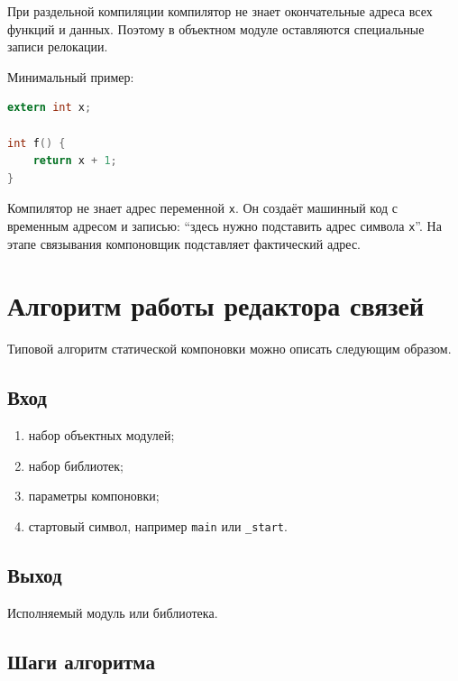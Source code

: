 \documentclass[12pt,a4paper]{article}
\begin{document}
При раздельной компиляции компилятор не знает окончательные адреса всех функций и данных. Поэтому в объектном модуле оставляются специальные записи релокации.

Минимальный пример:

\begin{lstlisting}[language=C]
extern int x;

int f() {
    return x + 1;
}
\end{lstlisting}

Компилятор не знает адрес переменной \texttt{x}. Он создаёт машинный код с временным адресом и записью: ``здесь нужно подставить адрес символа \texttt{x}''. На этапе связывания компоновщик подставляет фактический адрес.

\section{Алгоритм работы редактора связей}

Типовой алгоритм статической компоновки можно описать следующим образом.

\subsection*{Вход}

\begin{enumerate}
  \item набор объектных модулей;
  \item набор библиотек;
  \item параметры компоновки;
  \item стартовый символ, например \texttt{main} или \texttt{\_start}.
\end{enumerate}

\subsection*{Выход}

Исполняемый модуль или библиотека.

\subsection*{Шаги алгоритма}
\end{document}
